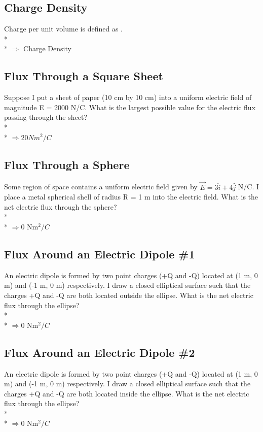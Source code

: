 \documentclass[11pt]{article}
\begin{document}
\subsection{Charge Density}
Charge per unit volume is defined as \underline{\hspace{1cm}}. \\* \\*
$\Rightarrow$ Charge Density

\subsection{Flux Through a Square Sheet}
Suppose I put a sheet of paper (10 cm by 10 cm) into a uniform electric field of magnitude E = 2000 N/C. What is the largest possible value for the electric flux passing through the sheet?\\* \\*
$\Rightarrow 20 Nm^2/C$

\subsection{Flux Through a Sphere}
Some region of space contains a uniform electric field given by $\vec{E} = 3\hat{i} + 4\hat{j}$ N/C.  I place a metal spherical shell of radius R = 1 m into the electric field.  What is the net electric flux through the sphere? \\* \\*
$\Rightarrow 0$ Nm$^2/C$

\subsection{Flux Around an Electric Dipole \#1}
An electric dipole is formed by two point charges (+Q and -Q) located at (1 m, 0 m) and (-1 m, 0 m) respectively.  I draw a closed elliptical surface such that the charges +Q and -Q are both located outside the ellipse.  What is the net electric flux through the ellipse? \\* \\*
$\Rightarrow 0$ Nm$^2/C$

\subsection{Flux Around an Electric Dipole \#2}
An electric dipole is formed by two point charges (+Q and -Q) located at (1 m, 0 m) and (-1 m, 0 m) respectively.  I draw a closed elliptical surface such that the charges +Q and -Q are both located inside the ellipse.  What is the net electric flux through the ellipse? \\* \\*
$\Rightarrow 0$ Nm$^2/C$

\end{document}
